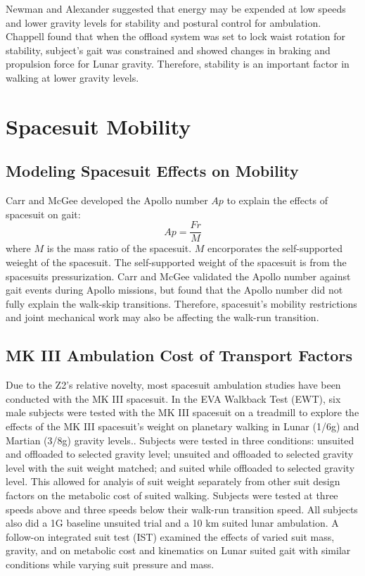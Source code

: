 \documentclass[defaultstyle,11pt]{comps}
\begin{document}
Newman and Alexander \citep{Newman1993} suggested that energy may be expended at low speeds and lower gravity levels for stability and postural control for ambulation.
Chappell \citep{Chappell2006} found that when the offload system was set to lock waist rotation for stability, subject's gait was constrained and showed changes in braking and propulsion force for Lunar gravity.
Therefore, stability is an important factor in walking at lower gravity levels.

\hypertarget{spacesuit-mobility}{%
\section{Spacesuit Mobility}\label{spacesuit-mobility}}

\hypertarget{modeling-spacesuit-effects-on-mobility}{%
\subsection{Modeling Spacesuit Effects on Mobility}\label{modeling-spacesuit-effects-on-mobility}}

Carr and McGee \citep{Carr2009} developed the Apollo number \(Ap\) to explain the effects of spacesuit on gait:
\[
Ap = \frac{Fr}{M}
\]
where \(M\) is the mass ratio of the spacesuit.
\(M\) encorporates the self-supported weieght of the spacesuit.
The self-supported weight of the spacesuit is from the spacesuits pressurization.
Carr and McGee validated the Apollo number against gait events during Apollo missions, but found that the Apollo number did not fully explain the walk-skip transitions.
Therefore, spacesuit's mobility restrictions and joint mechanical work may also be affecting the walk-run transition.

\hypertarget{mk-iii-ambulation-cost-of-transport-factors}{%
\subsection{MK III Ambulation Cost of Transport Factors}\label{mk-iii-ambulation-cost-of-transport-factors}}

Due to the Z2's relative novelty, most spacesuit ambulation studies have been conducted with the MK III spacesuit.
In the EVA Walkback Test (EWT), six male subjects were tested with the MK III spacesuit on a treadmill to explore the effects of the MK III spacesuit's weight on planetary walking in Lunar (1/6g) and Martian (3/8g) gravity levels..
Subjects were tested in three conditions: unsuited and offloaded to selected gravity level; unsuited and offloaded to selected gravity level with the suit weight matched; and suited while offloaded to selected gravity level\citep{Norcross2009}.
This allowed for analyis of suit weight separately from other suit design factors on the metabolic cost of suited walking.
Subjects were tested at three speeds above and three speeds below their walk-run transition speed.
All subjects also did a 1G baseline unsuited trial and a 10 km suited lunar ambulation.
A follow-on integrated suit test (IST) examined the effects of varied suit mass, gravity, and on metabolic cost and kinematics on Lunar suited gait \citep{Norcross2010} with similar conditions while varying suit pressure and mass.
\end{document}
